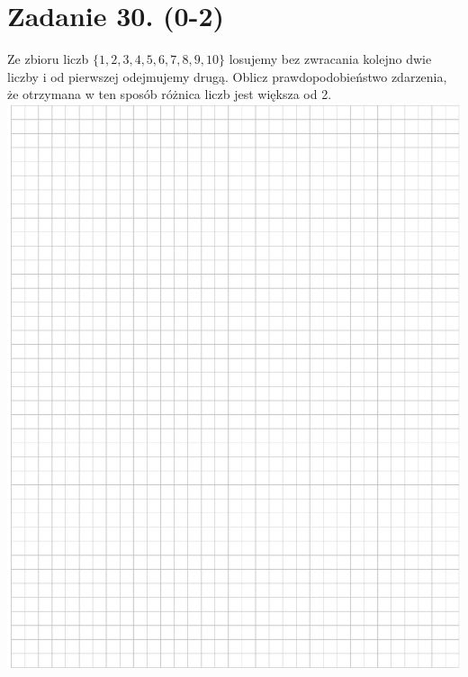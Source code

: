 \documentclass[10pt]{article}
\begin{document}
\section*{Zadanie 30. (0-2)}
Ze zbioru liczb \(\{1,2,3,4,5,6,7,8,9,10\}\) losujemy bez zwracania kolejno dwie liczby i od pierwszej odejmujemy drugą. Oblicz prawdopodobieństwo zdarzenia, że otrzymana w ten sposób różnica liczb jest większa od 2.\\
\includegraphics[max width=\textwidth, center]{2024_11_21_94f02db55673a8a7b820g-16}
\end{document}
